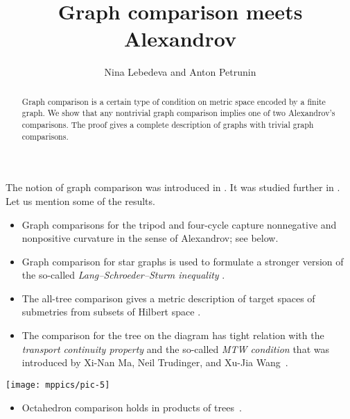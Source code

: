 \documentclass{article}
\def\thetitle{Graph comparison meets Alexandrov}
\def\theauthors{Nina Lebedeva and Anton Petrunin}
\def\parbf#1{\medskip\noindent{\bf #1}}
\begin{document}


\title{\thetitle}
\author{\theauthors}

\date{}
\maketitle
\begin{abstract}
Graph comparison is a certain type of condition on metric space encoded by a finite graph.
We show that any nontrivial graph comparison implies one of two Alexandrov's comparisons.
The proof gives a complete description of graphs with trivial graph comparisons.
\end{abstract}

\parbf{Preface.}
The notion of graph comparison was introduced in \cite{lebedeva-petrunin-zolotov}.
It was studied further in \cite{toyoda,toyoda2019,lebedeva-petrunin-CBB,lebedeva,lebedeva-petrunin,lebedeva-petrunin-octahedron}.
Let us mention some of the results.
\begin{itemize}
\item Graph comparisons for the tripod and four-cycle capture nonnegative and nonpositive curvature in the sense of Alexandrov; see below.
\end{itemize}
\begin{itemize}
\item Graph comparison for star graphs is used to formulate a stronger version of the so-called \emph{Lang--Schroeder--Sturm inequality} \cite{lang-schroeder, sturm, lebedeva-petrunin-CBB}.
\end{itemize}
\begin{itemize}
\item The all-tree comparison gives a metric description of target spaces of submetries from subsets of Hilbert space \cite{lebedeva-petrunin-zolotov}.
\end{itemize}

\noindent
\begin{minipage}
{.80\textwidth}
\begin{itemize}
\item The comparison for the tree on the diagram has tight relation with the \emph{transport continuity property} and the so-called \emph{MTW condition} that was introduced by Xi-Nan Ma, Neil Trudinger, and Xu-Jia Wang~\cite{lebedeva-petrunin-zolotov,ma-trudinger-wang}.
\end{itemize}
\end{minipage}
\hfill
\begin{minipage}{.17\textwidth}
\centering
\vskip-1mm
\texttt{[image: mppics/pic-5]}
\end{minipage}
\begin{itemize}
\item Octahedron comparison holds in products of trees~\cite{lebedeva-petrunin-octahedron}.
\end{itemize}
\end{document}
